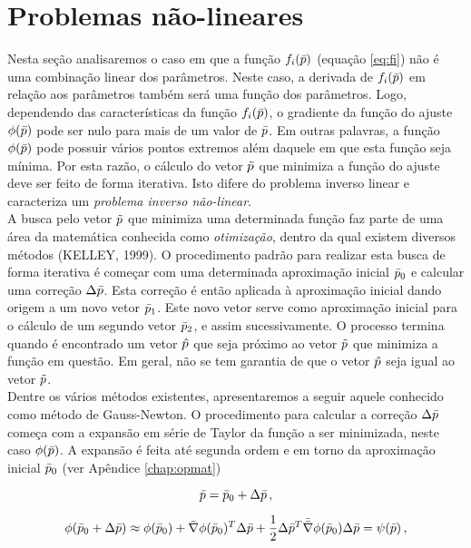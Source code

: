 \section{Problemas não-lineares}
\label{sec:nao-linear}

Nesta seção analisaremos o caso em que a função $f_i(\bar{p})$
(equação \ref{eq:fi}) não é uma combinação linear dos parâmetros.
Neste caso, a derivada de $f_i(\bar{p})$ em relação aos parâmetros também será
uma função dos parâmetros.
Logo, dependendo das características da função $f_i(\bar{p})$, o gradiente da
função do ajuste $\phi(\bar{p})$ pode ser nulo para mais de um valor de
$\bar{p}$.
Em outras palavras, a função $\phi(\bar{p})$ pode possuir
vários pontos extremos além daquele em que esta função seja mínima.
Por esta razão, o cálculo do vetor $\tilde{p}$ que minimiza a função do ajuste deve
ser feito de forma iterativa.
Isto difere do problema inverso linear e caracteriza um {\it problema inverso
não-linear}.
\\
\indent A busca pelo vetor $\tilde{p}$ que minimiza uma determinada função faz
parte de uma área da matemática conhecida como {\it otimização}, dentro da qual
existem diversos métodos (KELLEY, 1999).
O procedimento padrão para realizar esta busca de forma iterativa é começar com
uma determinada aproximação inicial $\bar{p}_0$ e calcular uma correção
$\Delta\bar{p}$.
Esta correção é então aplicada à aproximação inicial dando origem a um novo vetor
$\bar{p}_1$.
Este novo vetor serve como aproximação inicial para o cálculo de um segundo
vetor $\bar{p}_2$, e assim sucessivamente.
O processo termina quando é encontrado um vetor $\hat{p}$ que seja próximo ao
vetor $\tilde{p}$ que minimiza a função em questão.
Em geral, não se tem garantia de que o vetor $\hat{p}$ seja igual ao vetor
$\tilde{p}$.
\\
\indent Dentre os vários métodos existentes, apresentaremos a seguir aquele
conhecido como método de Gauss-Newton.
O procedimento para calcular a correção $\Delta\bar{p}$ começa com a
expansão em série de Taylor da função a ser minimizada, neste caso $\phi(\bar{p})$.
A expansão é feita até segunda ordem e em torno da aproximação inicial $\bar{p}_0$
(ver Apêndice \ref{chap:opmat})

\begin{equation}
\bar{p} =  \bar{p}_0 + \Delta\bar{p} \thinspace ,
\end{equation}

\begin{equation}
\phi(\bar{p}_0 + \Delta\bar{p}) \approx \phi(\bar{p}_0) +
    \bar{\nabla}\phi(\bar{p}_0)^T\Delta\bar{p} +
    \frac{1}{2}\Delta\bar{p}^T\bar{\bar{\nabla}}\phi(\bar{p}_0)\Delta\bar{p}
= \psi(\bar{p}) \thinspace ,
\label{eq:taylor}
\end{equation}


